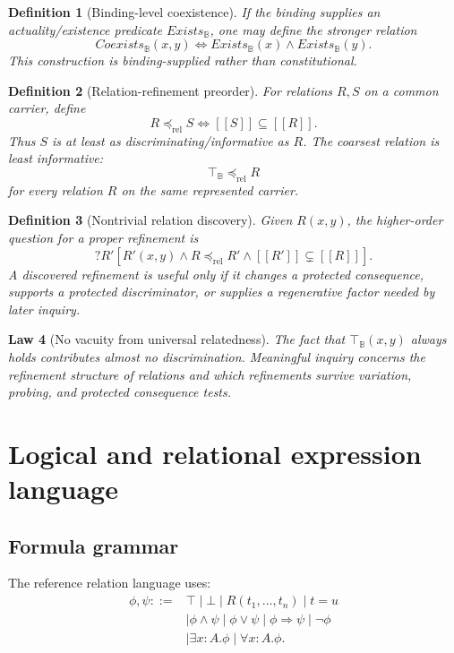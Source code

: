 \documentclass[11pt,oneside]{article}
\newtheorem{definition}{Definition}[section]
\newtheorem{law}[definition]{Law}
\newcommand{\B}{\mathbb B}
\newcommand{\den}[1]{[\![#1]\!]}
\begin{document}
\begin{definition}[Binding-level coexistence]
If the binding supplies an actuality/existence predicate \(Exists_{\B}\), one may define the stronger relation
\[
Coexists_{\B}(x,y)
\iff
Exists_{\B}(x)\land Exists_{\B}(y).
\]
This construction is binding-supplied rather than constitutional.
\end{definition}

\begin{definition}[Relation-refinement preorder]
For relations \(R,S\) on a common carrier, define
\[
\boxed{
R\preceq_{\mathrm{rel}}S
\iff
\den S\subseteq\den R.
}
\]
Thus \(S\) is at least as discriminating/informative as \(R\).  The coarsest relation is least informative:
\[
\top_{\B}\preceq_{\mathrm{rel}}R
\]
for every relation \(R\) on the same represented carrier.
\end{definition}

\begin{definition}[Nontrivial relation discovery]
Given \(R(x,y)\), the higher-order question for a proper refinement is
\[
\boxed{
?R'[
R'(x,y)
\land
R\preceq_{\mathrm{rel}}R'
\land
\den{R'}\subsetneq\den R
].
}
\]
A discovered refinement is useful only if it changes a protected consequence, supports a protected discriminator, or supplies a regenerative factor needed by later inquiry.
\end{definition}

\begin{law}[No vacuity from universal relatedness]
The fact that \(\top_{\B}(x,y)\) always holds contributes almost no discrimination.  Meaningful inquiry concerns the refinement structure of relations and which refinements survive variation, probing, and protected consequence tests.
\end{law}

\section{Logical and relational expression language}

\subsection{Formula grammar}

The reference relation language uses:
\[
\begin{aligned}
\phi,\psi ::= {}&
\top
\mid \bot
\mid R(t_1,\ldots,t_n)
\mid t=u\\
&\mid \phi\land\psi
\mid \phi\lor\psi
\mid \phi\Rightarrow\psi
\mid \neg\phi\\
&\mid \exists x:A.\phi
\mid \forall x:A.\phi.
\end{aligned}
\]
\end{document}
